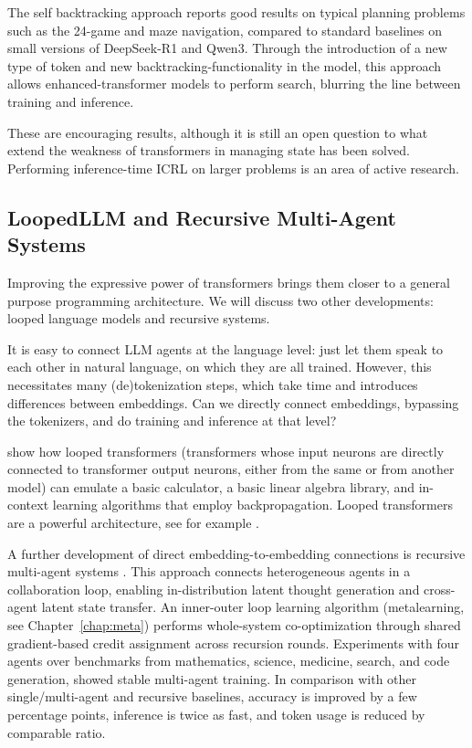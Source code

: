 The self backtracking approach reports good results on typical planning problems such as the 24-game and maze navigation, compared to standard baselines on small versions of DeepSeek-R1 and Qwen3. Through the introduction of a new type of token and new backtracking-functionality in the model, this approach allows enhanced-transformer models to perform search, blurring the line between training and inference.

These are encouraging results, although it is still an open question to what extend the weakness of transformers in managing state has been solved. Performing inference-time ICRL on larger problems is an area of active research. 


\subsection{LoopedLLM and Recursive Multi-Agent Systems}
Improving the  expressive power of transformers brings them closer to a general purpose programming architecture. We will discuss two other  developments: looped language models and recursive systems.

It is easy to connect LLM agents at the language level: just let them speak to each other in natural language, on which they are all trained. However, this necessitates many (de)tokenization steps, which take time and introduces differences between embeddings. Can we directly connect embeddings, bypassing the tokenizers, and do training and inference at that level?


\citet{giannou2023looped}
show  how %
looped transformers (transformers whose input neurons are directly connected to transformer
output neurons, either from the same or from another model) can emulate a basic
calculator, a basic linear algebra library, and in-context learning
algorithms that employ backpropagation. Looped transformers are a powerful architecture, see for example \citet{yang2023looped,saunshi2025reasoning,zhu2025scaling}.

A further development of direct embedding-to-embedding connections is recursive multi-agent systems \citep{yang2026recursive}. This approach  connects heterogeneous
agents in a collaboration loop, enabling in-distribution
latent thought generation and cross-agent latent state transfer. An inner-outer loop learning algorithm (metalearning, see Chapter~\ref{chap:meta}) performs  whole-system co-optimization through shared
gradient-based credit assignment across recursion rounds. Experiments with four agents over  benchmarks from mathematics,
science, medicine, search, and code generation, showed stable multi-agent training. In comparison with other single/multi-agent and
recursive  baselines, accuracy is improved by a few percentage points, inference is twice as fast, and token usage is  reduced by  comparable ratio. 

